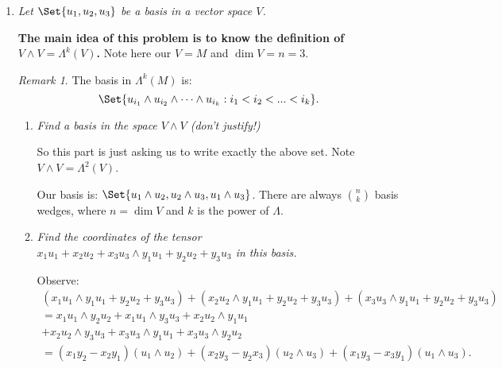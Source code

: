 \documentclass[9pt,reqno,twoside]{amsbook}
\theoremstyle{plain}
\numberwithin{section}{chapter}
\numberwithin{equation}{chapter}
\theoremstyle{definition}
\theoremstyle{remark}
\newtheorem{rem}[theorem]{Remark}
\theoremstyle{plain}
\newcommand{\sub}{\subseteq}
\newcommand{\mc}{\mathcal}
\newcommand{\bee}{\begin{equation}\begin{aligned}}
\newcommand{\eee}{\end{aligned}\end{equation}}
\begin{document}
\begin{enumerate}[label=\arabic*.]
\begin{proof}
Let $N$ be a module, $K \sub N$. Let $f \in N^*$, $f:N \to R$. Is $f$ defined on $N/R$? In other words, does $f$ induce a homomorphism $N/K \to R$? So do we have $f \in (N/K)^*$? This is so if $f(K) = 0$ (then $\forall u \in N$, $f(u + k) = f(u)$) The problem was to show that if you have a symmetric tensor $w$, that it maps elements of $\mc{C}^n(M) \to 0$. 


He would be happy with the row $w(\alpha - \sigma(\alpha)) = \cdots = 0$. But you need to know that definition of $\mc{C}^n(M)$. 
\end{proof}

\item \textit{Let $\Set{u_1,u_2,u_3}$ be a basis in a vector space $V$. }


\textbf{The main idea of this problem is to know the definition of $V \wedge V = \Lambda^k(V)$. }
Note here our $V = M$ and $\dim V = n = 3$. 
\begin{rem}
 The basis in $\Lambda^k(M)$ is:
 $$
 \Set{u_{i_1} \wedge u_{i_2} \wedge \cdots \wedge u_{i_k}: i_1 < i_2 < ... < i_k}.
 $$
 \end{rem}
 
 \begin{enumerate}
 \item \textit{Find a basis in the space $V \wedge V$ (don't justify!)}

 So this part is just asking us to write exactly the above set. Note $V \wedge V = \Lambda^2(V)$. 
 
 Our basis is: $\Set{u_1 \wedge u_2,u_2 \wedge u_3, u_1 \wedge u_3}$. There are always $\binom{n}{k}$ basis wedges, where $n = \dim V$ and $k$ is the power of $\Lambda$. 
 
 \item \textit{Find the coordinates of the tensor $x_1u_1 + x_2u_2 + x_3u_3 \wedge y_1u_1 + y_2u_2 + y_3u_3$ in this basis. }
 
 Observe:
 \bee
 (x_1u_1 \wedge y_1u_1 + y_2u_2 + y_3u_3) +( x_2u_2 \wedge y_1u_1 + y_2u_2 + y_3u_3) + (x_3u_3 \wedge y_1u_1 + y_2u_2 + y_3u_3)\\
 =x_1u_1 \wedge y_2u_2 + x_1u_1 \wedge y_3u_3 + x_2u_2 \wedge y_1u_1 \\
 + x_2u_2 \wedge y_3u_3 + x_3u_3 \wedge y_1u_1 + x_3u_3 \wedge y_2u_2\\
 =(x_1y_2 -x_2y_1)(u_1 \wedge u_2) + (x_2y_3 - y_2x_3)(u_2 \wedge u_3) +( x_1y_3 - x_3y_1)(u_1 \wedge u_3).
 \eee
 \end{enumerate}
 

\end{enumerate}
\end{document}
